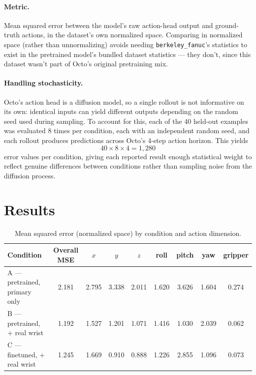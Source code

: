 \documentclass[11pt]{article}
\begin{document}
\paragraph{Metric.} Mean squared error between the model's raw action-head output and ground-truth actions, in the dataset's own normalized space. Comparing in normalized space (rather than unnormalizing) avoids needing \texttt{berkeley\_fanuc}'s statistics to exist in the pretrained model's bundled dataset statistics --- they don't, since this dataset wasn't part of Octo's original pretraining mix.

\paragraph{Handling stochasticity.} Octo's action head is a diffusion model, so a single rollout is not informative on its own: identical inputs can yield different outputs depending on the random seed used during sampling. To account for this, each of the 40 held-out examples was evaluated 8 times per condition, each with an independent random seed, and each rollout produces predictions across Octo's 4-step action horizon. This yields
\[
40 \times 8 \times 4 = 1{,}280
\]
error values per condition, giving each reported result enough statistical weight to reflect genuine differences between conditions rather than sampling noise from the diffusion process.

\section*{Results}

\begin{table}[h]
\centering
\begin{tabular}{lcccccccc}
\toprule
Condition & Overall MSE & $x$ & $y$ & $z$ & roll & pitch & yaw & gripper \\
\midrule
A --- pretrained, primary only & 2.181 & 2.795 & 3.338 & 2.011 & 1.620 & 3.626 & 1.604 & 0.274 \\
B --- pretrained, + real wrist & 1.192 & 1.527 & 1.201 & 1.071 & 1.416 & 1.030 & 2.039 & 0.062 \\
C --- finetuned, + real wrist  & 1.245 & 1.669 & 0.910 & 0.888 & 1.226 & 2.855 & 1.096 & 0.073 \\
\bottomrule
\end{tabular}
\caption{Mean squared error (normalized space) by condition and action dimension.}
\end{table}
\end{document}
